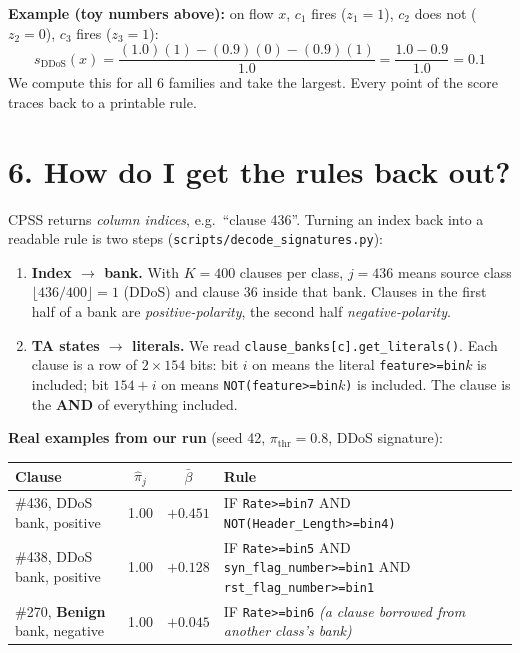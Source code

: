 \documentclass[11pt]{article}
\begin{document}
\textbf{Example (toy numbers above):} on flow $x$, $c_1$ fires ($z_1{=}1$),
$c_2$ does not ($z_2{=}0$), $c_3$ fires ($z_3{=}1$):
\[
s_{\text{DDoS}}(x)=\frac{(1.0)(1)-(0.9)(0)-(0.9)(1)}{1.0}
=\frac{1.0-0.9}{1.0}=0.1
\]
We compute this for all 6 families and take the largest. Every point of the
score traces back to a printable rule.

\section*{6. How do I get the rules back out?}

CPSS returns \emph{column indices}, e.g.\ ``clause 436''. Turning an index
back into a readable rule is two steps
(\texttt{scripts/decode\_signatures.py}):

\begin{enumerate}
  \item \textbf{Index $\rightarrow$ bank.} With $K=400$ clauses per class,
        $j=436$ means source class $\lfloor 436/400\rfloor = 1$ (DDoS) and
        clause 36 inside that bank. Clauses in the first half of a bank are
        \emph{positive-polarity}, the second half \emph{negative-polarity}.
  \item \textbf{TA states $\rightarrow$ literals.} We read
        \texttt{clause\_banks[c].get\_literals()}. Each clause is a row of
        $2\times154$ bits: bit $i$ on means the literal
        \texttt{feature>=bin$k$} is included; bit $154+i$ on means
        \texttt{NOT(feature>=bin$k$)} is included. The clause is the
        \textbf{AND} of everything included.
\end{enumerate}

\textbf{Real examples from our run} (seed 42, $\pi_{\mathrm{thr}}=0.8$,
DDoS signature):

\begin{center}
\footnotesize
\begin{tabular}{@{}p{}ccp{}@{}}
\toprule
Clause & $\hat\pi_j$ & $\bar\beta$ & Rule \\
\midrule
\#436, DDoS bank, positive & 1.00 & $+0.451$ &
IF \texttt{Rate>=bin7} AND \texttt{NOT(Header\_Length>=bin4)} \\
\#438, DDoS bank, positive & 1.00 & $+0.128$ &
IF \texttt{Rate>=bin5} AND \texttt{syn\_flag\_number>=bin1} AND \texttt{rst\_flag\_number>=bin1} \\
\#270, \textbf{Benign} bank, negative & 1.00 & $+0.045$ &
IF \texttt{Rate>=bin6} \quad\emph{(a clause borrowed from another class's bank)} \\
\bottomrule
\end{tabular}
\end{center}
\end{document}
